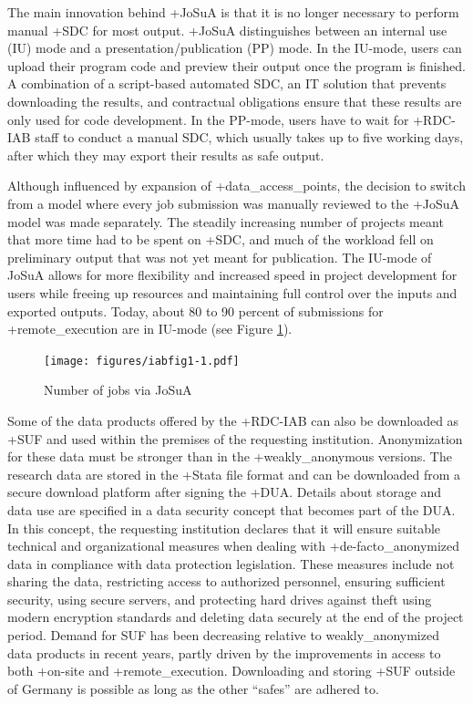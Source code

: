 \documentclass[
]{book}
\begin{document}
The main innovation behind +JoSuA\textbar{} is that it is no longer necessary to perform manual +SDC\textbar{} for most output. +JoSuA\textbar{} distinguishes between an internal use (IU) mode and a presentation/publication (PP) mode. In the IU-mode, users can upload their program code and preview their output once the program is finished. A combination of a script-based automated SDC, an IT solution that prevents downloading the results, and contractual obligations ensure that these results are only used for code development. In the PP-mode, users have to wait for +RDC-IAB\textbar{} staff to conduct a manual SDC, which usually takes up to five working days, after which they may export their results as safe output.

Although influenced by expansion of +data\_access\_points\textbar, the decision to switch from a model where every job submission was manually reviewed to the +JoSuA\textbar{} model was made separately. The steadily increasing number of projects meant that more time had to be spent on +SDC\textbar, and much of the workload fell on preliminary output that was not yet meant for publication. The IU-mode of JoSuA allows for more flexibility and increased speed in project development for users while freeing up resources and maintaining full control over the inputs and exported outputs. Today, about 80 to 90 percent of submissions for +remote\_execution\textbar{} are in IU-mode (see Figure \ref{fig:iabfig1}).

\begin{figure}
\centering
\texttt{[image: figures/iabfig1-1.pdf]}
\caption{\label{fig:iabfig1}Number of jobs via JoSuA}
\end{figure}

Some of the data products offered by the +RDC-IAB\textbar{} can also be downloaded as +SUF\textbar{} and used within the premises of the requesting institution. Anonymization for these data must be stronger than in the +weakly\_anonymous\textbar{} versions. The research data are stored in the +Stata\textbar{} file format and can be downloaded from a secure download platform after signing the +DUA\textbar. Details about storage and data use are specified in a data security concept that becomes part of the DUA. In this concept, the requesting institution declares that it will ensure suitable technical and organizational measures when dealing with +de-facto\_anonymized\textbar{} data in compliance with data protection legislation. These measures include not sharing the data, restricting access to authorized personnel, ensuring sufficient security, using secure servers, and protecting hard drives against theft using modern encryption standards and deleting data securely at the end of the project period. Demand for SUF has been decreasing relative to weakly\_anonymized data products in recent years, partly driven by the improvements in access to both +on-site\textbar{} and +remote\_execution\textbar. Downloading and storing +SUF\textbar{} outside of Germany is possible as long as the other ``safes'' are adhered to.
\end{document}

